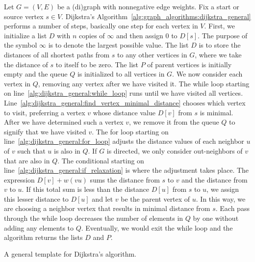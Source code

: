 Let $G = (V,E)$ be a (di)graph with nonnegative edge
weights. Fix a start or source
vertex $s \in V$. Dijkstra's
Algorithm~\ref{alg:graph_algorithms:dijkstra_general} performs a
number of steps, basically one step for each vertex in $V$. First, we
initialize a list $D$ with $n$ copies of $\infty$ and then assign $0$
to $D[s]$. The purpose of the symbol $\infty$ is to denote the largest
possible value. The list $D$ is to store the distances
of all shortest paths from $s$ to any other
vertices in $G$, where we take the distance of $s$ to itself to be
zero. The list $P$ of parent vertices is initially empty and the
queue $Q$ is initialized to all vertices in $G$. We now
consider each vertex in $Q$, removing any vertex after we have visited
it. The while loop starting on
line~\ref{alg:dijkstra_general:while_loop} runs until we have visited
all vertices.
Line~\ref{alg:dijkstra_general:find_vertex_minimal_distance} chooses
which vertex to visit, preferring a vertex $v$ whose distance value
$D[v]$ from $s$ is minimal. After we have
determined such a vertex $v$, we remove it from the queue
$Q$ to signify that we have visited $v$. The for loop starting on
line~\ref{alg:dijkstra_general:for_loop} adjusts the distance values
of each neighbor $u$ of $v$ such that $u$ is also in $Q$. If $G$ is
directed, we only consider out-neighbors of $v$
that are also in $Q$. The conditional starting on
line~\ref{alg:dijkstra_general:if_relaxation} is where the adjustment
takes place. The expression $D[v] + w(vu)$ sums the distance from $s$
to $v$ and the distance from $v$ to $u$. If this total sum is less
than the distance $D[u]$ from $s$ to $u$, we assign this lesser
distance to $D[u]$ and let $v$ be the parent vertex of $u$. In this
way, we are choosing a neighbor vertex that results in minimal
distance from $s$. Each pass through the while
loop decreases the number of elements in $Q$ by one without adding any
elements to $Q$. Eventually, we would exit the while loop and the
algorithm returns the lists $D$ and $P$.

\begin{algorithm}[!htbp]

\caption{A general template for Dijkstra's algorithm.}
\label{alg:graph_algorithms:dijkstra_general}
\end{algorithm}

